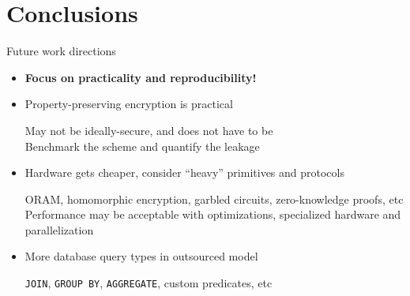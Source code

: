 \section{Conclusions}

	\begin{frame}{Future work directions}

		\begin{itemize}
			\item<1->
				\textbf{Focus on practicality and reproducibility!}

			\item<2->
				Property-preserving encryption is practical \cite{ore-benchmark-17, k-anon} \\
				\begin{small}
					\indent{} May not be ideally-secure, and does not have to be \\
					\indent{} Benchmark the scheme and quantify the leakage
				\end{small}

			\item<3->
				Hardware gets cheaper, consider ``heavy'' primitives and protocols \cite{epsolute} \\
				\begin{small}
					\indent{} ORAM, homomorphic encryption, garbled circuits, zero-knowledge proofs, etc \\
					\indent{} Performance may be acceptable with optimizations, specialized hardware and parallelization
				\end{small}

			\item<4->
				More database query types in outsourced model \\
				\begin{small}
					\indent{} \texttt{JOIN}, \texttt{GROUP BY}, \texttt{AGGREGATE}, custom predicates, etc
				\end{small}

		\end{itemize}

	\end{frame}
